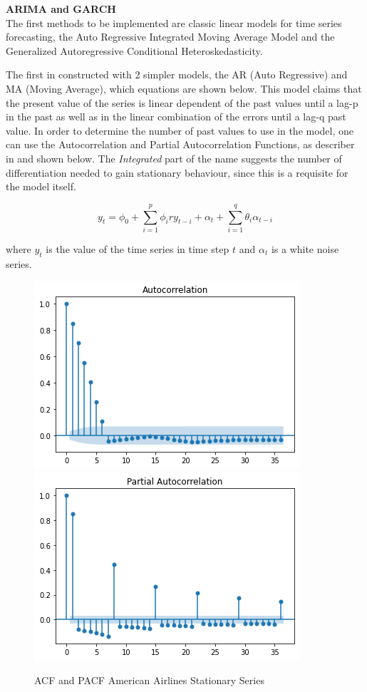 \documentclass[10pt,twocolumn,letterpaper]{article}
\begin{document}
	\textbf{ARIMA and GARCH} \\
	
	The first methods to be implemented are classic linear models for time series forecasting, the Auto Regressive Integrated Moving Average Model and the Generalized Autoregressive Conditional Heteroskedasticity.
	
	The first in constructed with 2 simpler models, the AR (Auto Regressive) and MA (Moving Average), which equations are shown below. This model claims that the present value of the series is linear dependent of the past values until a lag-p in the past as well as in the linear combination of the errors until a lag-q past value. In order to determine the number of past values to use in the model, one can use the Autocorrelation and Partial Autocorrelation Functions, as describer in \cite{tsay2005analysis} and shown below. The \textit{Integrated} part of the name suggests the number of differentiation needed to gain stationary behaviour, since this is a requisite for the model itself.
	
	\begin{equation}
		y_t=\phi_0+\sum_{i=1}^{p}\phi_iry_{t-i}+\alpha_t+\sum_{i=1}^{q}\theta_i\alpha_{t-i}
	\end{equation} 
	
	where $y_t$ is the value of the time series in time step $t$ and $\alpha_t$ is a white noise series.
	
	\begin{figure}[h]
		\centering
		\includegraphics[width=0.45\linewidth]{../img/SeriesAnalysis/ACF_AmericanDiff}
		\includegraphics[width=0.45\linewidth]{../img/SeriesAnalysis/PACF_AmericanDiff}
		\caption{ACF and PACF American Airlines Stationary Series}
		\label{fig:acfamericandiff}
	\end{figure}
	
\end{document}
